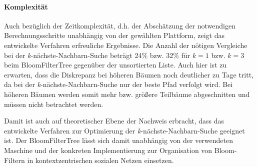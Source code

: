 \paragraph*{Komplexität}
Auch bezüglich der Zeitkomplexität, d.h. der Abschätzung der notwendigen Berechnungsschritte unabhängig von der gewählten Plattform, zeigt das entwickelte Verfahren erfreuliche Ergebnisse. Die Anzahl der nötigen Vergleiche bei der \textit{k}-nächste-Nachbarn-Suche beträgt 24\% bzw. 32\% für $k=1$ bzw. $k=3$ beim BloomFilterTree gegenüber der unsortierten Liste. Auch hier ist zu erwarten, dass die Diskrepanz bei höheren Bäumen noch deutlicher zu Tage tritt, da bei der \textit{k}-nächste-Nachbarn-Suche nur der beste Pfad verfolgt wird. Bei höheren Bäumen werden somit mehr bzw. größere Teilbäume abgeschnitten und müssen nicht betrachtet werden.

Damit ist auch auf theoretischer Ebene der Nachweis erbracht, dass das entwickelte Verfahren zur Optimierung der \textit{k}-nächste-Nachbarn-Suche geeignet ist. Der BloomFilterTree lässt sich damit unabhängig von der verwendeten Maschine und der konkreten Implementierung zur Organisation von Bloom-Filtern in kontextzentrischen sozialen Netzen einsetzen. 